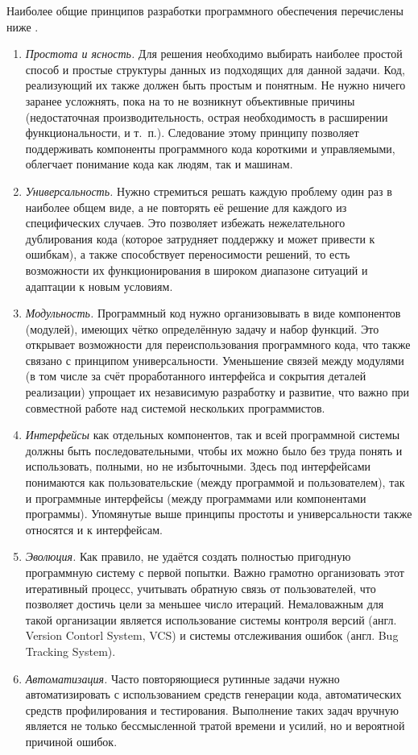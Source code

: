 \documentclass[a4paper, 14pt, titlepage]{extarticle}
\newcommand{\eng}[1]{\foreignlanguage{english}{#1}}
\newcommand{\term}[1]{\emph{#1}}
\begin{document}
  Наиболее общие принципов разработки программного обеспечения перечислены ниже \cite{kernighan-practice}.
  \begin{enumerate}
    \item \term{Простота и ясность.} Для решения необходимо выбирать наиболее простой способ и простые
      структуры данных из подходящих для данной задачи. Код, реализующий их также должен быть
      простым и понятным. Не нужно ничего заранее усложнять, пока на то не возникнут объективные
      причины (недостаточная производительность, острая необходимость в расширении функциональности, и т.~п.).
      Следование этому принципу позволяет поддерживать компоненты программного кода короткими и
      управляемыми, облегчает понимание кода как людям, так и машинам.
    \item \term{Универсальность.} Нужно стремиться решать каждую проблему один раз в наиболее общем виде,
      а не повторять её решение для каждого из специфических случаев. Это позволяет избежать
      нежелательного дублирования кода (которое затрудняет поддержку и может привести к
      ошибкам), а также способствует переносимости решений, то есть возможности их функционирования в широком
      диапазоне ситуаций и адаптации к новым условиям.
    \item \term{Модульность.} Программный код нужно организовывать в виде компонентов
      (модулей), имеющих чётко определённую задачу и набор функций. Это открывает возможности для
      переиспользования программного кода, что также связано с принципом универсальности.
      Уменьшение связей между модулями (в том числе за счёт проработанного интерфейса и сокрытия
      деталей реализации) упрощает их независимую разработку и развитие, что важно при совместной
      работе над системой нескольких программистов.
    \item \term{Интерфейсы} как отдельных компонентов, так и всей программной
      системы должны быть последовательными, чтобы их можно было без труда понять и использовать,
      полными, но не избыточными. Здесь под интерфейсами понимаются как пользовательские (между
      программой и пользователем), так и программные интерфейсы (между программами или компонентами программы).
      Упомянутые выше принципы простоты и универсальности также относятся и к интерфейсам.
    \item \term{Эволюция.} Как правило, не удаётся создать полностью пригодную программную систему с
      первой попытки. Важно грамотно организовать этот итеративный процесс, учитывать обратную
      связь от пользователей, что позволяет достичь цели за меньшее число итераций.
      Немаловажным для такой организации является использование системы контроля версий (англ. \eng{Version
      Contorl System, VCS}) и системы отслеживания ошибок (англ. \eng{Bug Tracking System}).
    \item \term{Автоматизация.} Часто повторяющиеся рутинные задачи нужно автоматизировать с
      использованием средств генерации кода, автоматических средств профилирования и тестирования.
      Выполнение таких задач вручную является не только бессмысленной тратой времени и усилий, но и вероятной
      причиной ошибок.
  \end{enumerate}
\end{document}
